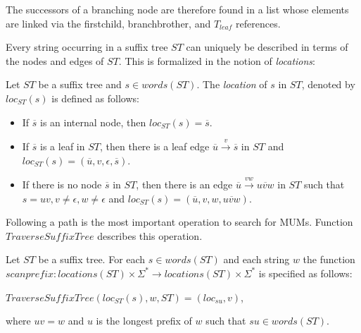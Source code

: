 \documentclass[conference]{IEEEtran}
\begin{document}
The successors of a branching node are therefore found in a list whose elements are linked via the firstchild, branchbrother, and $T_{leaf}$ references. 

Every string occurring in a suffix tree $ST$ can uniquely be described in terms of the nodes and edges of $ST$. This is formalized in the notion of \textit{locations}:

\begin{mydef}
Let $ST$ be a suffix tree and $s \in words(ST)$. The \textit{location} of $s$ in $ST$, denoted by $loc_{ST}(s)$ is defined as follows:
\begin{itemize}
\item If $\overline{s}$ is an internal node, then $loc_{ST}(s)=\overline{s}$.
\item If $\overline{s}$ is a leaf in $ST$, then there is a leaf edge $\overline{u}\overset{v}{\rightarrow}\overline{s}$ in $ST$ and $loc_{ST}(s)=(\overline{u},v,\epsilon,\overline{s})$.
\item If there is no node $\overline{s}$ in $ST$, then there is an edge $\overline{u}\overset{vw}{\rightarrow}\overline{uvw}$ in $ST$ such that $s=uv, v\neq \epsilon, w\neq \epsilon$ and $loc_{ST}(s)=(\overline{u},v,w,\overline{uvw})$.
\end{itemize}
\end{mydef}

Following a path is the most important operation to search for MUMs. Function $TraverseSuffixTree$ describes this operation.
\begin{mydef}
Let $ST$ be a suffix tree. For each $s \in words(ST)$ and each string $w$ the function $scanprefix: locations(ST)\times\Sigma^{*}\rightarrow locations(ST)\times\Sigma^{*}$ is specified as follows: 
\begin{center}
$TraverseSuffixTree(loc_{ST}(s),w,ST)=(loc_{su},v)$,
\end{center}
where $uv=w$ and $u$ is the longest prefix of $w$ such that $su \in words(ST)$.
\end{mydef}
\end{document}
